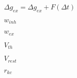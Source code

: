 $\Delta g_{ex} = \Delta g_{ex} + F(\Delta t)$

$w_{inh}$

$w_{ex}$

$V_{th}$

$V_{rest}$

$r_{kc}$

